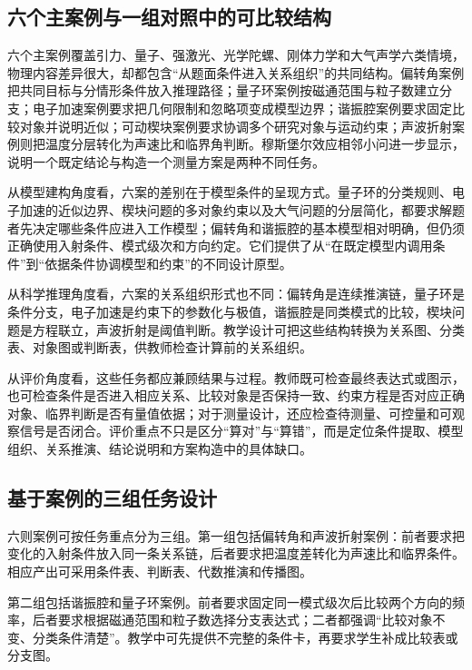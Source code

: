 \documentclass[
  12pt,
  a4paper,twoside,openany]{ctexbook}
\begin{document}
\subsection{六个主案例与一组对照中的可比较结构}\label{ux516dux4e2aux4e3bux6848ux4f8bux4e0eux4e00ux7ec4ux5bf9ux7167ux4e2dux7684ux53efux6bd4ux8f83ux7ed3ux6784}

六个主案例覆盖引力、量子、强激光、光学陀螺、刚体力学和大气声学六类情境，物理内容差异很大，却都包含``从题面条件进入关系组织''的共同结构。偏转角案例把共同目标与分情形条件放入推理路径；量子环案例按磁通范围与粒子数建立分支；电子加速案例要求把几何限制和忽略项变成模型边界；谐振腔案例要求固定比较对象并说明近似；可动楔块案例要求协调多个研究对象与运动约束；声波折射案例则把温度分层转化为声速比和临界角判断。穆斯堡尔效应相邻小问进一步显示，说明一个既定结论与构造一个测量方案是两种不同任务。

从模型建构角度看，六案的差别在于模型条件的呈现方式。量子环的分类规则、电子加速的近似边界、楔块问题的多对象约束以及大气问题的分层简化，都要求解题者先决定哪些条件应进入工作模型；偏转角和谐振腔的基本模型相对明确，但仍须正确使用入射条件、模式级次和方向约定。它们提供了从``在既定模型内调用条件''到``依据条件协调模型和约束''的不同设计原型。

从科学推理角度看，六案的关系组织形式也不同：偏转角是连续推演链，量子环是条件分支，电子加速是约束下的参数化与极值，谐振腔是同类模式的比较，楔块问题是方程联立，声波折射是阈值判断。教学设计可把这些结构转换为关系图、分类表、对象图或判断表，供教师检查计算前的关系组织。

从评价角度看，这些任务都应兼顾结果与过程。教师既可检查最终表达式或图示，也可检查条件是否进入相应关系、比较对象是否保持一致、约束方程是否对应正确对象、临界判断是否有量值依据；对于测量设计，还应检查待测量、可控量和可观察信号是否闭合。评价重点不只是区分``算对''与``算错''，而是定位条件提取、模型组织、关系推演、结论说明和方案构造中的具体缺口。

\subsection{基于案例的三组任务设计}\label{ux57faux4e8eux6848ux4f8bux7684ux4e09ux7ec4ux4efbux52a1ux8bbeux8ba1}

六则案例可按任务重点分为三组。第一组包括偏转角和声波折射案例：前者要求把变化的入射条件放入同一条关系链，后者要求把温度差转化为声速比和临界条件。相应产出可采用条件表、判断表、代数推演和传播图。

第二组包括谐振腔和量子环案例。前者要求固定同一模式级次后比较两个方向的频率，后者要求根据磁通范围和粒子数选择分支表达式；二者都强调``比较对象不变、分类条件清楚''。教学中可先提供不完整的条件卡，再要求学生补成比较表或分支图。
\end{document}

